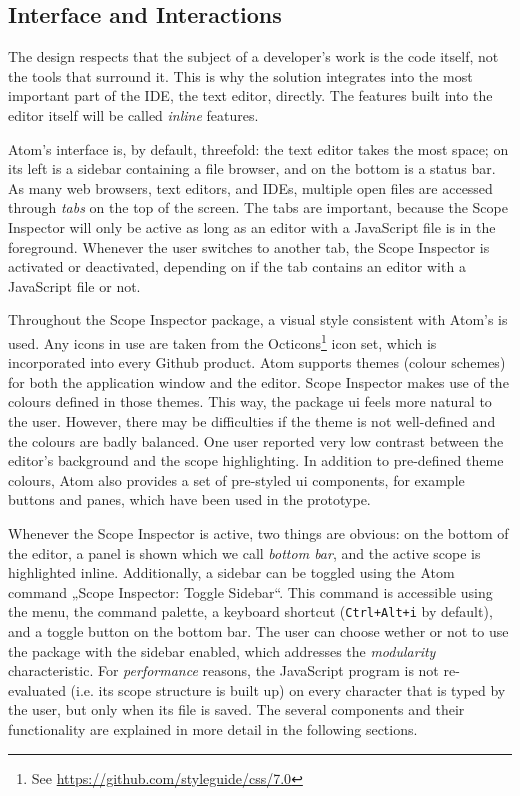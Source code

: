 \subsection{Interface and
Interactions}\label{interface-and-interactions}

The design respects that the subject of a developer’s work is the code
itself, not the tools that surround it. This is why the solution
integrates into the most important part of the IDE, the text editor,
directly. The features built into the editor itself will be called
\emph{inline} features.

Atom’s interface is, by default, threefold: the text editor takes the
most space; on its left is a sidebar containing a file browser, and on
the bottom is a status bar. As many web browsers, text editors, and
IDEs, multiple open files are accessed through \emph{tabs} on the top of
the screen. The tabs are important, because the Scope Inspector will
only be active as long as an editor with a JavaScript file is in the
foreground. Whenever the user switches to another tab, the Scope
Inspector is activated or deactivated, depending on if the tab contains
an editor with a JavaScript file or not.

Throughout the Scope Inspector package, a visual style consistent with
Atom’s is used. Any icons in use are taken from the
Octicons\footnote{See \url{https://github.com/styleguide/css/7.0}} icon
set, which is incorporated into every Github product. Atom supports
themes (colour schemes) for both the application window and the editor.
Scope Inspector makes use of the colours defined in those themes. This
way, the package \ac{ui} feels more natural to the user. However, there
may be difficulties if the theme is not well-defined and the colours are
badly balanced. One user reported very low contrast between the editor’s
background and the scope highlighting. In addition to pre-defined theme
colours, Atom also provides a set of pre-styled \ac{ui} components, for
example buttons and panes, which have been used in the prototype.

Whenever the Scope Inspector is active, two things are obvious: on the
bottom of the editor, a panel is shown which we call \emph{bottom bar},
and the active scope is highlighted inline. Additionally, a sidebar can
be toggled using the Atom command „Scope Inspector: Toggle Sidebar“.
This command is accessible using the menu, the command palette, a
keyboard shortcut (\texttt{Ctrl+Alt+i} by default), and a toggle button
on the bottom bar. The user can choose wether or not to use the package
with the sidebar enabled, which addresses the \emph{modularity}
characteristic. For \emph{performance} reasons, the JavaScript program
is not re-evaluated (i.e. its scope structure is built up) on every
character that is typed by the user, but only when its file is saved.
The several components and their functionality are explained in more
detail in the following sections.

